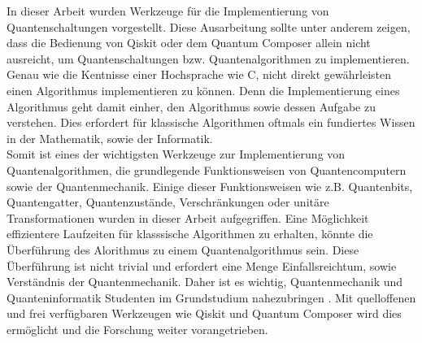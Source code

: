 In dieser Arbeit wurden Werkzeuge f\"ur die Implementierung von Quantenschaltungen vorgestellt. Diese Ausarbeitung sollte unter anderem zeigen, dass die Bedienung von Qiskit oder dem Quantum Composer allein nicht ausreicht, um Quantenschaltungen bzw. Quantenalgorithmen zu implementieren. Genau wie die Kentnisse einer Hochsprache wie C, nicht direkt gew\"ahrleisten einen Algorithmus implementieren zu k\"onnen. Denn die Implementierung eines Algorithmus geht damit einher, den Algorithmus sowie dessen Aufgabe zu verstehen. Dies erfordert f\"ur klassische Algorithmen oftmals ein fundiertes Wissen in der Mathematik, sowie der Informatik.\\
Somit ist eines der wichtigsten Werkzeuge zur Implementierung von Quantenalgorithmen, die grundlegende Funktionsweisen von Quantencomputern sowie der Quantenmechanik. Einige dieser Funktionsweisen wie z.B. Quantenbits, Quantengatter, Quantenzust\"ande, Verschr\"ankungen oder unit\"are Transformationen wurden in dieser Arbeit aufgegriffen.
Eine M\"oglichkeit effizientere Laufzeiten f\"ur klasssische Algorithmen zu erhalten, k\"onnte die \"Uberf\"uhrung des Alorithmus zu einem Quantenalgorithmus sein. Diese \"Uberf\"uhrung ist nicht trivial und erfordert eine Menge Einfallsreichtum, sowie Verst\"andnis der Quantenmechanik. Daher ist es wichtig, Quantenmechanik und Quanteninformatik Studenten im Grundstudium nahezubringen \cite{Fedortchenko_2016}. Mit quelloffenen und frei verf\"ugbaren Werkzeugen wie Qiskit und Quantum Composer wird dies erm\"oglicht und die Forschung weiter vorangetrieben.
